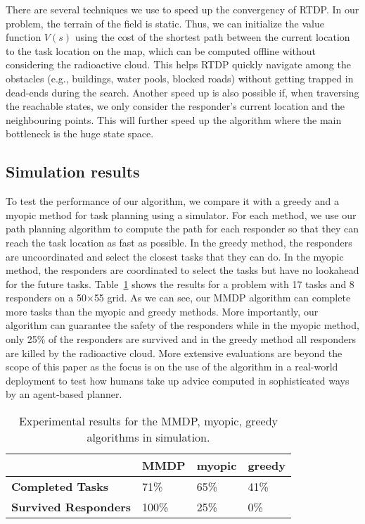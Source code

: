 There are several techniques we use to speed up the convergency of
RTDP. In our problem, the terrain of the field is static. Thus, we
can initialize the value function $V(s)$ using the cost of the
shortest path between the current location to the task location on
the map, which can be computed offline without considering the
radioactive cloud. This helps RTDP quickly navigate among the
obstacles (e.g., buildings, water pools, blocked roads) without
getting trapped in dead-ends during the search. Another speed up is
also possible if, when traversing the reachable states, we only
consider the responder's current location and the neighbouring
points. This will further speed up the algorithm where the main
bottleneck is the huge state space.

\subsection{Simulation results}



\noindent To test the performance of our algorithm, we compare it
with a greedy and a myopic method for task planning using a
simulator. For each method, we use our path planning algorithm to
compute the path for each responder so that they can reach the task
location as fast as possible. In the greedy method, the responders
are uncoordinated and select the closest tasks that they can do. In
the myopic method, the responders are coordinated to select the
tasks but have no lookahead for the future tasks.
Table~\ref{tab:simulation} shows the results for a problem with 17
tasks and 8 responders on a 50$\times$55 grid. As we can see, our
MMDP algorithm can complete more tasks than the myopic and greedy
methods. More importantly, our algorithm can guarantee the safety
of the responders while in the myopic method, only 25\% of the
responders are survived and in the greedy method all responders are
killed by the radioactive cloud. More extensive evaluations are
beyond the scope of this paper as the focus is on the use of the
algorithm in a real-world deployment to test how humans take up
advice computed in sophisticated ways by an agent-based planner.

\begin{table}[htbp]
  \centering\vspace{-15pt}
  \caption{Experimental results for the MMDP, myopic, greedy
  algorithms in simulation.}
  \begin{tabular}{|l||l|l|l|}
  \hline
   & {\bf MMDP} & {\bf myopic} & {\bf greedy} \\
  \hline\hline
  {\bf Completed Tasks} & 71\% & 65\% & 41\% \\
  \hline
  {\bf Survived Responders} & 100\% & 25\% & 0\% \\
  \hline
  \end{tabular}
  \label{tab:simulation}\vspace{-3mm}
\end{table}


